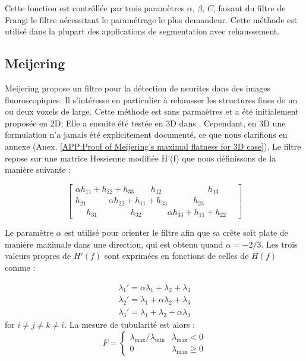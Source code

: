 Cette fonction est contrôllée par trois paramètres $\alpha$, $\beta$, $C$, faisant du filtre de Frangi le filtre nécessitant le paramétrage le plus demandeur. Cette méthode est utilisé dans la plupart des applications de segmentation avec rehaussement.

\subsection{Meijering}

Meijering \etal \cite{Meijering2004_neurite_vesselness} propose un filtre pour la détection de neurites dans des images fluoroscopiques. Il s'intéresse en particulier à rehausser les structures fines de un ou deux voxels de large. Cette méthode est sans parmaètres et a été initialement proposée en 2D; Elle a ensuite été testée en 3D dans \cite{Obara2012_phase}. Cependant, en 3D une formulation n'a jamais été explicitement documenté, ce que nous clarifions en annexe (Anex. \ref{APP:Proof of Meijering's maximal flatness for 3D case}). Le filtre repose sur une matrice Hessienne modifiée H'(f) que nous définissons de la manière suivante :

\begin{equation}
    \begin{bmatrix}
    \alpha h_{11}+ h_{22} +   h_{33} ~~~~~~~~~ h_{12} ~~~~~~~~~~~~~~~~~~~~~~~~~ h_{13} ~~~~~~~~ \\
    h_{21} ~~~~~~~~~~~~ \alpha h_{22} + h_{11} +  h_{33} ~~~~~~~~~~~~~~ h_{23} \\
    ~~~~~~ h_{31} ~~~~~~~~~~~~~~~~~~ h_{32} ~~~~~~~~~~~~~~ \alpha h_{33} + h_{11} +  h_{22}
    \end{bmatrix}
  \end{equation}

Le paramètre $\alpha$ est utilisé pour orienter le filtre afin que sa crête soit plate de manière maximale dans une direction, qui est obtenu quand $\alpha=-2/3$. Les trois valeurs propres de $H'(f)$ sont exprimées en fonctions de celles de $H(f)$ comme :

\begin{equation}
  \begin{aligned}
    \nonumber \lambda_1' = \alpha\lambda_1 + \lambda_2 + \lambda_3 \\
    \nonumber \lambda_2' = \lambda_1 + \alpha\lambda_2 + \lambda_3 \\
    \nonumber \lambda_3' = \lambda_1 + \lambda_2 + \alpha\lambda_3
  \end{aligned}
\end{equation}
for $i \neq j \neq k \neq i$.
La mesure de tubularité est alors :
\begin{equation}
\nonumber 
  F =
  \left\{
  \begin{array}{lr}
    \lambda_{\max} / \lambda_{\min}   &  \lambda_{\max} < 0\\
      0 &  \lambda_{\max} \geqslant 0
  \end{array}
  \right.
\end{equation}

